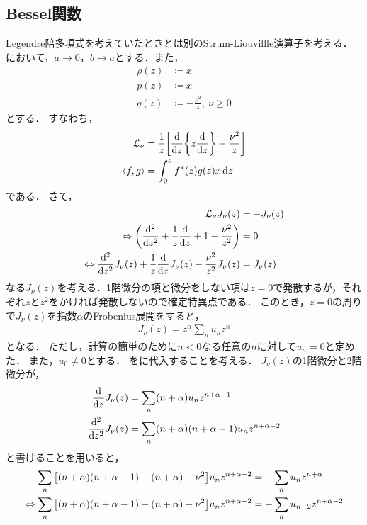 \documentclass{report}
\begin{document}
  \subsection{Bessel関数}
    Legendre陪多項式を考えていたときとは別のStrum-Liouvillle演算子を考える．
    において，$a \to 0$，$b \to a$とする．また，
    \begin{align}
      \rho(z) &\coloneqq x \\ 
      p(z) &\coloneqq x \\ 
      q(z) &\coloneqq -\frac{\nu^2}{z},\ \nu \geq 0
    \end{align}
    とする．
    すなわち，
    \begin{align}
      \mathcal{L}_{\nu} &= \frac{1}{z}\qty[\dv{z}\qty{z\dv{z}} - \frac{\nu^2}{z}] \\ 
      \left\langle f, g \right\rangle &= \int_{0}^{a}f^*(z)g(z)x\dd{z}
    \end{align}
    である．
    さて，
    \begin{align}
      \mathcal{L}_{\nu}J_{\nu}(z) &= - J_{\nu}(z)  \\ 
      \Leftrightarrow \qty(\dv[2]{z} + \frac{1}{z}\dv{z} + 1 - \frac{\nu^2}{z^2}) &= 0 \label{bessel-differential-eq-sub}\\ 
      \Leftrightarrow \dv[2]{z}J_{\nu}(z) + \frac{1}{z}\dv{z}J_{\nu}(z) - \frac{\nu^2}{z^2}J_{\nu}(z) &= J_{\nu}(z) \label{bessel-differential-eq}
    \end{align}
    なる$J_{\nu}(z)$を考える．1階微分の項と微分をしない項は$z = 0$で発散するが，それぞれ$z$と$z^2$をかければ発散しないので確定特異点である．
    このとき，$z = 0$の周りで$J_{\nu}(z)$を指数$\alpha$のFrobenius展開をすると，
    \begin{align}
      J_{\nu}(z) = z^{\alpha}\sum_{n}u_nz^n\label{bessel-func-frobenius}
    \end{align}
    となる．
    ただし，計算の簡単のために$n < 0$なる任意の$n$に対して$u_n = 0$と定めた．
    また，$u_0 \neq 0$とする．
    をに代入することを考える．
    $J_{\nu}(z)$の1階微分と2階微分が，
    \begin{align}
      \dv{z}J_{\nu}(z) &= \sum_{n}(n + \alpha)u_nz^{n + \alpha - 1} \\ 
      \dv[2]{z}J_{\nu}(z) &= \sum_{n}(n + \alpha)(n + \alpha - 1)u_nz^{n + \alpha - 2} 
    \end{align}
    と書けることを用いると，
    \begin{align}
      \sum_{n}\qty[(n + \alpha)(n + \alpha - 1) + (n + \alpha) - \nu^2]u_nz^{n + \alpha - 2} &= -\sum_{n}u_nz^{n + \alpha} \\ 
      \Leftrightarrow \sum_{n}\qty[(n + \alpha)(n + \alpha - 1) + (n + \alpha) - \nu^2]u_nz^{n + \alpha - 2} &= -\sum_{n}u_{n - 2}z^{n + \alpha -2} 
    \end{align}
\end{document}
